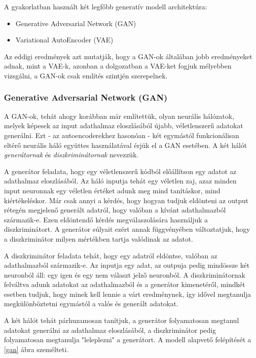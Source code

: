 \documentclass[12pt]{article}
\begin{document}
A gyakorlatban használt két legfőbb generatív modell architektúra:
\begin{itemize}
  \item Generative Adversarial Network (GAN)
  \item Variational AutoEncoder (VAE)
\end{itemize}

Az eddigi eredmények azt mutatják, hogy a GAN-ok általában jobb eredményeket adnak, mint a VAE-k, azonban a dolgozatban a VAE-ket fogjuk mélyebben vizsgálni, a GAN-ok csak említés szintjén szerepelnek.

\subsubsection{Generative Adversarial Network (GAN)}

A GAN-ok, tehát ahogy korábban már említettük, olyan neurális hálózatok, melyek képesek az input adathalmaz eloszlásából újabb, véletlenszerű adatokat generálni. Ezt - az autoencoderekhez hasonóan - két egymástól funkcionálisan eltérő neurális háló együttes használatával érjük el a GAN esetében. A két hálót \textit{generátornak} és \textit{diszkriminátornak} nevezzük.

A generátor feladata, hogy egy véletlenszerű kódból előállítson egy adatot az adathalmaz eloszlásából. Az háló inputja tehát egy véletlen zaj, azaz minden input neuronnak egy véletlen értéket adunk meg mind tanításkor, mind kiértékeléskor. Már csak annyi a kérdés, hogy hogyan tudjuk eldönteni az output rétegén megjelenő generált adatról, hogy valóban a kívánt adathalmazból származik-e. Ezen eldöntendő kérdés megválaszolására használjuk a diszkriminátort. A generátor súlyait ezért annak függvényében változtatjuk, hogy a diszkriminátor milyen mértékben tartja valódinak az adatot.

A diszkriminátor feladata tehát, hogy egy adatról eldöntse, valóban az adathalmazból származik-e. Az inputja egy adat, az outpuja pedig mindössze két neuronból áll: egy igen és egy nem választ jelző neuronból. A diszkriminátornak felváltva adunk adatokat az adathalmazból és a generátor kimenetéről, mindkét esetben tudjuk, hogy minek kell lennie a várt eredménynek, így idővel megtanulja megkülönböztetni egymástól a valós és generált adatokat. 

A két hálót tehát párhuzamosan tanítjuk, a generátor folyamatosan megtanul adatokat generálni az adathalmaz eloszlásából, a diszkriminátor pedig folyamatosan megtanulja "leleplezni" a generátort. A modell alapvető felépítését a \ref{gan} ábra személteti.
\end{document}
